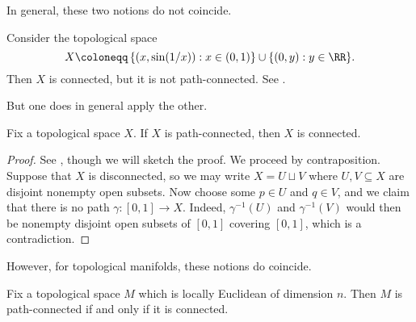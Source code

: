 \documentclass[../notes.tex]{subfiles}
\begin{document}
In general, these two notions do not coincide.
\begin{example}
	Consider the topological space
	\[X\coloneqq\left\{(x,\sin(1/x)):x\in(0,1)\right\}\cup\{(0,y):y\in\RR\}.\]
	Then $X$ is connected, but it is not path-connected. See \cite[Exercise~A.20]{elber-top}.
\end{example}
But one does in general apply the other.
\begin{lemma} \label{lem:path-connected-to-connected}
	Fix a topological space $X$. If $X$ is path-connected, then $X$ is connected.
\end{lemma}
\begin{proof}
	See \cite[Lemma~A.16]{elber-top}, though we will sketch the proof. We proceed by contraposition. Suppose that $X$ is disconnected, so we may write $X=U\sqcup V$ where $U,V\subseteq X$ are disjoint nonempty open subsets. Now choose some $p\in U$ and $q\in V$, and we claim that there is no path $\gamma\colon[0,1]\to X$. Indeed, $\gamma^{-1}(U)$ and $\gamma^{-1}(V)$ would then be nonempty disjoint open subsets of $[0,1]$ covering $[0,1]$, which is a contradiction.
\end{proof}
However, for topological manifolds, these notions do coincide.
\begin{proposition}
	Fix a topological space $M$ which is locally Euclidean of dimension $n$. Then $M$ is path-connected if and only if it is connected.
\end{proposition}
\end{document}

